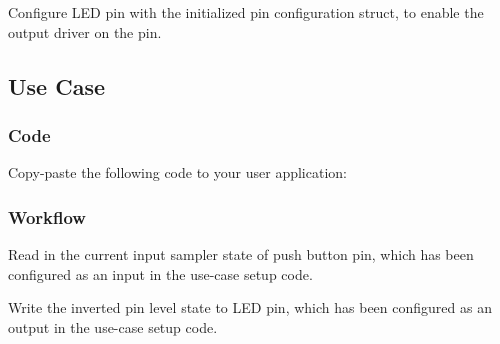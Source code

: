 \begin{DoxyEnumerate}
\item Configure L\+E\+D pin with the initialized pin configuration struct, to enable the output driver on the pin. 
\begin{DoxyCodeInclude}
\end{DoxyCodeInclude}
 
\end{DoxyEnumerate}\hypertarget{asfdoc_sam0_port_basic_use_case_asfdoc_sam0_port_basic_use_case_use_main}{}\subsection{Use Case}\label{asfdoc_sam0_port_basic_use_case_asfdoc_sam0_port_basic_use_case_use_main}
\hypertarget{asfdoc_sam0_port_basic_use_case_asfdoc_sam0_port_basic_use_case_code}{}\subsubsection{Code}\label{asfdoc_sam0_port_basic_use_case_asfdoc_sam0_port_basic_use_case_code}
Copy-\/paste the following code to your user application\+: 
\begin{DoxyCodeInclude}
\end{DoxyCodeInclude}
 \hypertarget{asfdoc_sam0_port_basic_use_case_asfdoc_sam0_port_basic_use_case_flow}{}\subsubsection{Workflow}\label{asfdoc_sam0_port_basic_use_case_asfdoc_sam0_port_basic_use_case_flow}

\begin{DoxyEnumerate}
\item Read in the current input sampler state of push button pin, which has been configured as an input in the use-\/case setup code. 
\begin{DoxyCodeInclude}
\end{DoxyCodeInclude}

\item Write the inverted pin level state to L\+E\+D pin, which has been configured as an output in the use-\/case setup code. 
\begin{DoxyCodeInclude}
\end{DoxyCodeInclude}

\end{DoxyEnumerate}